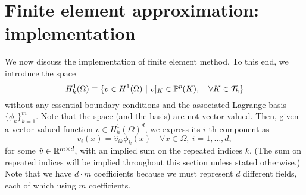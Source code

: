 \section{Finite element approximation: implementation}
We now discuss the implementation of finite element method. To this end, we introduce the space
\begin{equation*}
  H^1_h(\Omega) \equiv \{ v \in H^1(\Omega) \ | \ v|_K \in \mathbb{P}^p(K) , \quad \forall K \in \mathcal{T}_h \} 
\end{equation*}
without any essential boundary conditions and the associated Lagrange basis $\{ \phi_k \}_{k=1}^m$.  Note that the space (and the basis) are not vector-valued. Then, given a vector-valued function $v \in H^1_h(\Omega)^d$, we express its $i$-th component as
\begin{equation*}
  v_i(x) = \hat v_{ik} \phi_k(x) \quad \forall x \in \Omega, \ i = 1,\dots, d,
\end{equation*}
for some $\hat v \in \mathbb{R}^{m \times d}$, with an implied sum on the repeated indices $k$. (The sum on repeated indices will be implied throughout this section unless stated otherwise.)  Note that we have $d\cdot m$ coefficients because we must represent $d$ different fields, each of which using $m$ coefficients.

